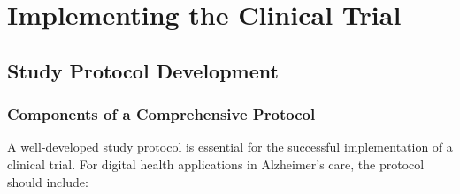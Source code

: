 \chapter{Implementing the Clinical Trial}

\section{Study Protocol Development}
\subsection{Components of a Comprehensive Protocol}
A well-developed study protocol is essential for the successful implementation of a clinical trial. For digital health applications in Alzheimer's care, the protocol should include:

